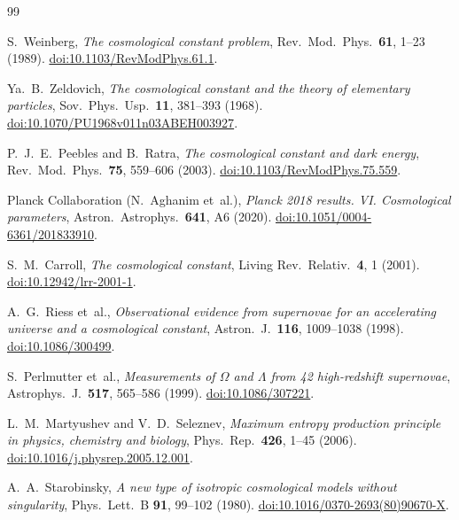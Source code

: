 \documentclass[12pt,a4paper]{article}
\theoremstyle{definition}
\theoremstyle{plain}
\theoremstyle{remark}
\begin{document}
\begin{thebibliography}{99}
\sloppy
\raggedright
\setlength{\emergencystretch}{3em}

S.~Weinberg,
\textit{The cosmological constant problem},
Rev.\ Mod.\ Phys.\ \textbf{61}, 1--23 (1989).
\href{https://doi.org/10.1103/RevModPhys.61.1}{doi:10.1103/RevModPhys.61.1}.

Ya.~B.~Zeldovich,
\textit{The cosmological constant and the theory of elementary particles},
Sov.\ Phys.\ Usp.\ \textbf{11}, 381--393 (1968).
\href{https://doi.org/10.1070/PU1968v011n03ABEH003927}{doi:10.1070/PU1968v011n03ABEH003927}.

P.~J.~E.~Peebles and B.~Ratra,
\textit{The cosmological constant and dark energy},
Rev.\ Mod.\ Phys.\ \textbf{75}, 559--606 (2003).
\href{https://doi.org/10.1103/RevModPhys.75.559}{doi:10.1103/RevModPhys.75.559}.

Planck Collaboration (N.~Aghanim et~al.),
\textit{Planck 2018 results. VI. Cosmological parameters},
Astron.\ Astrophys.\ \textbf{641}, A6 (2020).
\href{https://doi.org/10.1051/0004-6361/201833910}{doi:10.1051/0004-6361/201833910}.

S.~M.~Carroll,
\textit{The cosmological constant},
Living Rev.\ Relativ.\ \textbf{4}, 1 (2001).
\href{https://doi.org/10.12942/lrr-2001-1}{doi:10.12942/lrr-2001-1}.

A.~G.~Riess et~al.,
\textit{Observational evidence from supernovae for an accelerating
universe and a cosmological constant},
Astron.\ J.\ \textbf{116}, 1009--1038 (1998).
\href{https://doi.org/10.1086/300499}{doi:10.1086/300499}.

S.~Perlmutter et~al.,
\textit{Measurements of $\Omega$ and $\Lambda$ from 42 high-redshift
supernovae},
Astrophys.\ J.\ \textbf{517}, 565--586 (1999).
\href{https://doi.org/10.1086/307221}{doi:10.1086/307221}.

L.~M.~Martyushev and V.~D.~Seleznev,
\textit{Maximum entropy production principle in physics, chemistry and biology},
Phys.\ Rep.\ \textbf{426}, 1--45 (2006).
\href{https://doi.org/10.1016/j.physrep.2005.12.001}{doi:10.1016/j.physrep.2005.12.001}.

A.~A.~Starobinsky,
\textit{A new type of isotropic cosmological models without singularity},
Phys.\ Lett.\ B \textbf{91}, 99--102 (1980).
\href{https://doi.org/10.1016/0370-2693(80)90670-X}{doi:10.1016/0370-2693(80)90670-X}.


\end{thebibliography}
\end{document}
